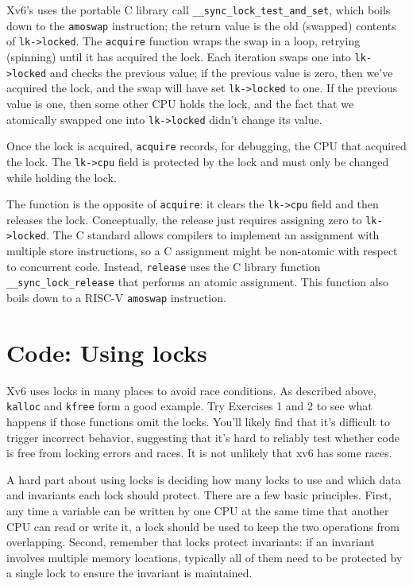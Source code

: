 Xv6's 
uses the portable C library call 
\lstinline{__sync_lock_test_and_set},
which boils down to the
\lstinline{amoswap}
instruction;
the return value is the old (swapped) contents of
\lstinline{lk->locked}.
The
\lstinline{acquire}
function wraps the swap in a loop, retrying (spinning) until it has
acquired the lock.
Each iteration swaps one into
\lstinline{lk->locked} 
and checks the previous value;
if the previous value is zero, then we've acquired the
lock, and the swap will have set 
\lstinline{lk->locked}
to one.
If the previous value is one, then some other CPU
holds the lock, and the fact that we atomically swapped one into
\lstinline{lk->locked}
didn't change its value.

Once the lock is acquired,
\lstinline{acquire}
records, for debugging, the CPU 
that acquired the lock.
The
\lstinline{lk->cpu}
field is protected by the lock
and must only be changed while holding the lock.

The function
is the opposite of 
\lstinline{acquire}:
it clears the 
\lstinline{lk->cpu}
field
and then releases the lock.
Conceptually, the release just requires assigning zero to
\lstinline{lk->locked}.
The C standard allows compilers to implement an assignment
with multiple store instructions,
so a C assignment might be non-atomic with respect
to concurrent code.
Instead,
\lstinline{release}
uses the C library function
\lstinline{__sync_lock_release}
that performs an atomic assignment.
This function also boils down to a RISC-V
\lstinline{amoswap}
instruction.
\section{Code: Using locks}
Xv6 uses locks in many places to avoid race conditions.
As described above,
\lstinline{kalloc}
and
\lstinline{kfree}
form a good example.
Try Exercises 1 and 2 to see what happens if those
functions omit the locks.
You'll likely find that it's difficult to trigger incorrect
behavior, suggesting that it's hard to reliably test whether code
is free from locking errors and races.
It is not unlikely that xv6 has some races.

A hard part about using locks is deciding how many locks
to use and which data and invariants each lock should protect.
There are a few basic principles.
First, any time a variable can be written by one CPU
at the same time that another CPU can read or write it,
a lock should be used to keep the two
operations from overlapping.
Second, remember that locks protect invariants:
if an invariant involves multiple memory locations,
typically all of them need to be protected
by a single lock to ensure the invariant is maintained.

